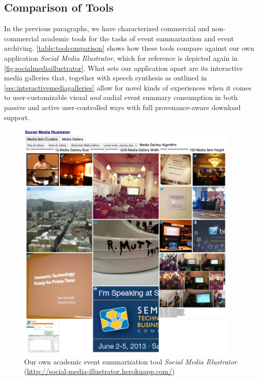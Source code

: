 \subsection{Comparison of Tools}

In the previous paragraphs, we have characterized
commercial and non-commercial academic tools for the tasks
of event summarization and event archiving.
\autoref{table:toolcomparison} shows how these tools
compare against our own application \emph{Social Media Illustrator},
which for reference is depicted again in \autoref{fig:socialmediaillustrator}.
What sets our application apart
are its interactive media galleries that,
together with speech synthesis as outlined in \autoref{sec:interactivemediagalleries}
allow for novel kinds of experiences when it comes to
user-customizable visual \emph{and} audial event summary consumption in both passive and active user-controlled ways
with full provenance-aware download support.

\begin{figure}
  \centering
  \includegraphics[width=0.95\textwidth,height=0.9\textheight,keepaspectratio]{socialmediaillustrator.png}
  \caption[Our own academic event summarization tool \emph{Social Media Illustrator}]{Our own academic event summarization tool \emph{Social Media Illustrator} (\url{http://social-media-illustrator.herokuapp.com/})}
  \label{fig:socialmediaillustrator}
\end{figure}

